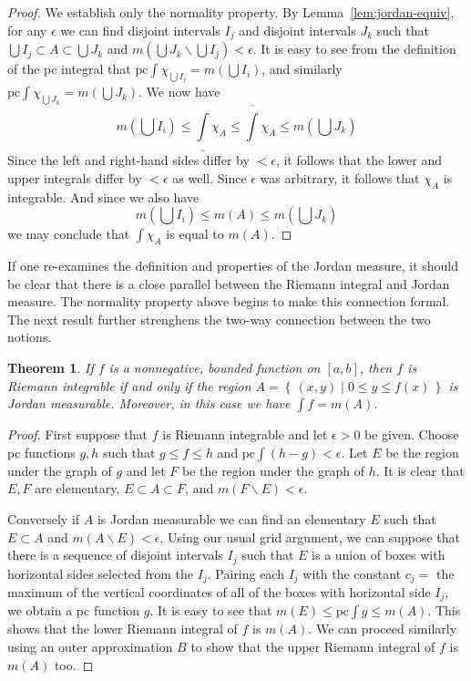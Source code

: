 \documentclass[11pt,oneside]{amsbook}
\newcommand{\set}[1]{\left\{\,#1\,\right\}}
\renewcommand{\setminus}{\smallsetminus}
\newcommand{\lint}{\underline\int}
\newcommand{\ovint}{\overline\int}
\theoremstyle{definition}
\theoremstyle{plain}
\newtheorem{thm}{Theorem}[section]
\theoremstyle{definition}
\theoremstyle{remark}
\numberwithin{equation}{section}
\numberwithin{figure}{section}
\begin{document}
\begin{proof}
  We establish only the normality property. By Lemma~\ref{lem:jordan-equiv}, for any $\epsilon$ we can find disjoint intervals $I_j$ and disjoint intervals $J_k$ such that $\bigcup I_j\subset A\subset\bigcup J_k$ and $m(\bigcup J_k\setminus\bigcup I_j)<\epsilon$. It is easy to see from the definition of the pc integral that $\text{pc}\int\chi_{\bigcup I_j}=m(\bigcup I_i)$, and similarly $\text{pc}\int\chi_{\bigcup J_k}=m(\bigcup J_k)$. We now have
  \[m(\bigcup I_i)\leq\lint\chi_A\leq\ovint\chi_A
  \leq m(\bigcup J_k)
  \]
  Since the left and right-hand sides differ by $<\epsilon$, it follows that the lower and upper integrals differ by $<\epsilon$ as well. Since $\epsilon$ was arbitrary, it follows that $\chi_A$ is integrable. And since we also have
  \[m(\bigcup I_i)\leq m(A)\leq m(\bigcup J_k)
  \]
  we may conclude that $\int\chi_A$ is equal to $m(A)$.
\end{proof}

If one re-examines the definition and properties of the Jordan measure, it should be clear that there is a close parallel between the Riemann integral and Jordan measure. The normality property above begins to make this connection formal. The next result further strenghens the two-way connection between the two notions.

\begin{thm}
  If $f$ is a nonnegative, bounded function on $[a,b]$, then $f$ is Riemann integrable if and only if the region $A=\set{(x,y)\mid0\leq y\leq f(x)}$ is Jordan measurable. Moreover, in this case we have $\int f=m(A)$.
\end{thm}

\begin{proof}
  First suppose that $f$ is Riemann integrable and let $\epsilon>0$ be given. Choose pc functions $g,h$ such that $g\leq f\leq h$ and $\text{pc}\int(h-g)<\epsilon$. Let $E$ be the region under the graph of $g$ and let $F$ be the region under the graph of $h$. It is clear that $E,F$ are elementary, $E\subset A\subset F$, and $m(F\setminus E)<\epsilon$.

  Conversely if $A$ is Jordan measurable we can find an elementary $E$ such that $E\subset A$ and $m(A\setminus E)<\epsilon$. Using our usual grid argument, we can suppose that there is a sequence of disjoint intervals $I_j$ such that $E$ is a union of boxes with horizontal sides selected from the $I_j$. Pairing each $I_j$ with the constant $c_j=$ the maximum of the vertical coordinates of all of the boxes with horizontal side $I_j$, we obtain a pc function $g$. It is easy to see that $m(E)\leq \text{pc}\int g\leq m(A)$. This shows that the lower Riemann integral of $f$ is $m(A)$. We can proceed similarly using an outer approximation $B$ to show that the upper Riemann integral of $f$ is $m(A)$ too.
\end{proof}
\end{document}
